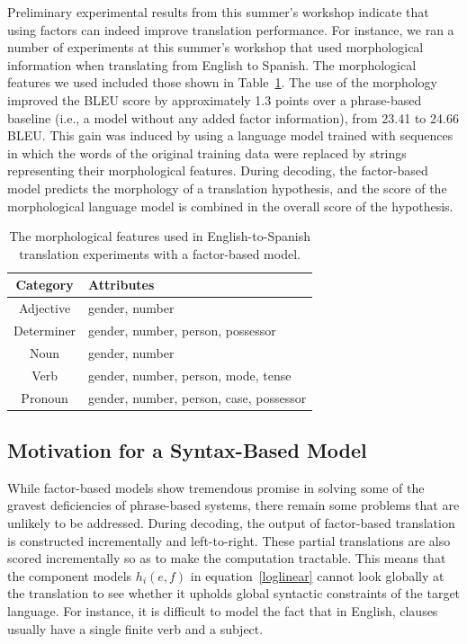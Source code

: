 \documentclass[11pt]{report}
\theoremstyle{plain}
\begin{document}
{Preliminary experimental results from this summer's workshop indicate
that using factors can indeed improve translation performance. For
instance, we ran a number of experiments at this summer's workshop
that used morphological information when translating from English to
Spanish. The morphological features we used included those shown in
Table~\ref{morph}. The use of the morphology improved the BLEU score
by approximately 1.3 points over a phrase-based baseline (i.e., a
model without any added factor information), from 23.41 to 24.66
BLEU. This gain was induced by using a language model trained with
sequences in which the words of the original training data were
replaced by strings representing their morphological features. During
decoding, the factor-based model predicts the morphology of a
translation hypothesis, and the score of the morphological language
model is combined in the overall score of the hypothesis.

\begin{table}
\begin{center}
\begin{tabular}{|c|l|}
\hline
{\bf Category} & {\bf Attributes} \\
\hline
Adjective & gender, number \\
\hline
Determiner & gender, number, person, possessor \\
\hline
Noun & gender, number \\
\hline
Verb & gender, number, person, mode, tense \\
\hline
Pronoun & gender, number, person, case, possessor \\
\hline
\end{tabular}
\end{center}
\caption{The morphological features used in English-to-Spanish
translation experiments with a factor-based model.}
\label{morph}
\end{table}

\subsection{Motivation for a Syntax-Based Model}
While factor-based models show tremendous promise in solving some of
the gravest deficiencies of phrase-based systems, there remain some
problems that are unlikely to be addressed. During decoding, the
output of factor-based translation is constructed incrementally and
left-to-right. These partial translations are also scored
incrementally so as to make the computation tractable. This means that
the component models $h_i(e,f)$ in equation~\ref{loglinear} cannot
look globally at the translation to see whether it upholds global
syntactic constraints of the target language. For instance, it is
difficult to model the fact that in English, clauses usually have a
single finite verb and a subject.

}
\end{document}
